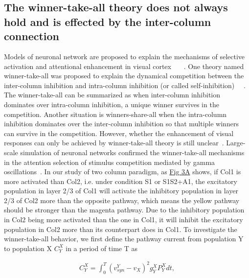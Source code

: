 \documentclass[10pt,letterpaper]{article}
\begin{document}
\subsection*{The winner-take-all theory does not always hold and is effected by the inter-column connection}
Models of neuronal network are proposed to explain the mechanisms of selective activation and attentional enhancement in visual cortex ~\cite{reynolds1999}~\cite{boynton2005}~\cite{buia2008}. One theory named winner-take-all was proposed to explain the dynamical competition between the inter-column inhibition and intra-column inhibition (or called self-inhibition) ~\cite{fukai1997}~\cite{wagatsuma2011}. The winner-take-all can be summarized as when inter-column inhibition dominates over intra-column inhibition, a unique winner survives in the competition. Another situation is winners-share-all when the intra-column inhibition dominates over the inter-column inhibition so that multiple winners can survive in the competition. However, whether the enhancement of visual responses can only be achieved by winner-take-all theory is still unclear~\cite{dieter2016}. Large-scale simulation of neuronal networks confirmed the winner-take-all mechanisms in the attention selection of stimulus competition mediated by gamma oscillations~\cite{borgers2008}. In our study of two column paradigm, as \hyperlink{fig:fig3}{Fig 3A} shows, if Col1 is more activated than Col2, i.e. under condition S1 or S1S2+A1, the excitatory population in layer 2/3 of Col1 will activate the inhibitory population in layer 2/3 of Col2 more than the opposite pathway, which means the yellow pathway should be stronger than the magenta pathway. Due to the inhibitory population in Col2 being more activated than the one in Col1, it will inhibit the excitatory population in Col2 more than its counterpart does in Col1.
To investigate the winner-take-all behavior, we first define the pathway current from population Y to population X $C_{Y}^{X}$ in a period of time T as

\begin{eqnarray}
\label{eq:6}
    C_{Y}^{X} = \int_{0}^{T}(v_{syn}^{Y}-v_{X})^{2}g_{Y}^{X}P_{Y}^{X}dt,
\end{eqnarray}
\end{document}

